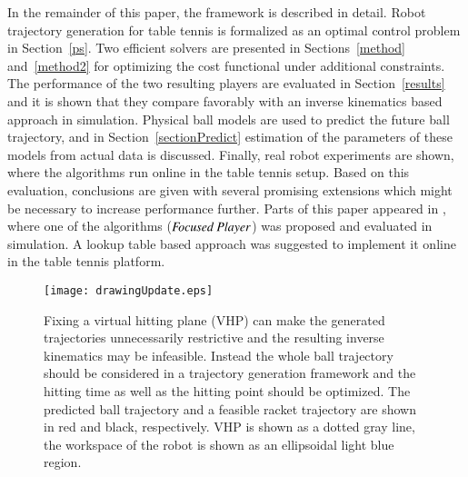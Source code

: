 In the remainder of this paper, the framework is described in detail. Robot trajectory generation for table tennis is formalized as an optimal control problem in Section~\ref{ps}. Two efficient solvers are presented in Sections~\ref{method} and~\ref{method2} for optimizing the cost functional under additional constraints. The performance of the two resulting players are evaluated in Section~\ref{results} and it is shown that they compare favorably with an inverse kinematics based approach in simulation. Physical ball models are used to predict the future ball trajectory, and in Section~\ref{sectionPredict} estimation of the parameters of these models from actual data is discussed. Finally, real robot experiments are shown, where the algorithms run online in the table tennis setup. Based on this evaluation, conclusions are given with several promising extensions which might be necessary to increase performance further. Parts of this paper appeared in \citet{Koc16}, where one of the algorithms ($\emph{Focused Player}$) was proposed and evaluated in simulation. A lookup table based approach was suggested to implement it online in the table tennis platform.

\begin{figure}[t!]
\centering
\texttt{[image: drawingUpdate.eps]}			
\caption{Fixing a virtual hitting plane (VHP) can make the generated trajectories unnecessarily restrictive and the resulting inverse kinematics may be infeasible. Instead the whole ball trajectory should be considered in a trajectory generation framework and the hitting time as well as the hitting point should be optimized. The predicted ball trajectory and a feasible racket trajectory are shown in red and black, respectively. VHP is shown as a dotted gray line, the workspace of the robot is shown as an ellipsoidal light blue region.}
\label{mainIdea}
\end{figure}